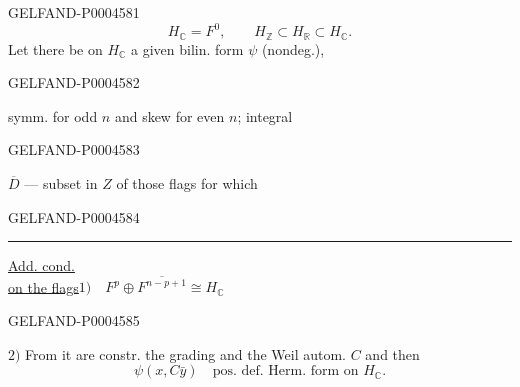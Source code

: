 \begin{GelfandAdjacentEvidence}{GELFAND-P000458}{1}
\[
H_{\mathbb C}=F^0,\qquad H_{\mathbb Z}\subset H_{\mathbb R}\subset H_{\mathbb C}.
\]
Let there be on $H_{\mathbb C}$ a given bilin. form $\psi$ (nondeg.),
\end{GelfandAdjacentEvidence}
\begin{GelfandAdjacentEvidence}{GELFAND-P000458}{2}

symm. for odd $n$ and skew for even $n$; integral
\end{GelfandAdjacentEvidence}
\begin{GelfandAdjacentEvidence}{GELFAND-P000458}{3}


$\overline D$ — subset in $Z$ of those flags for which
\end{GelfandAdjacentEvidence}
\begin{GelfandAdjacentEvidence}{GELFAND-P000458}{4}


\noindent\rule{\linewidth}{.35pt}

\underline{Add. cond.}\\
\underline{on the flags}\quad $1)\quad F^p\oplus\overline{F^{n-p+1}}\cong H_{\mathbb C}$
\end{GelfandAdjacentEvidence}
\begin{GelfandAdjacentEvidence}{GELFAND-P000458}{5}


$2)$ From it are constr. the grading and the Weil autom. $C$ and then
\[
\psi(x,C\bar y)\quad\text{pos. def. Herm. form on $H_{\mathbb C}$.}
\]
\end{GelfandAdjacentEvidence}
